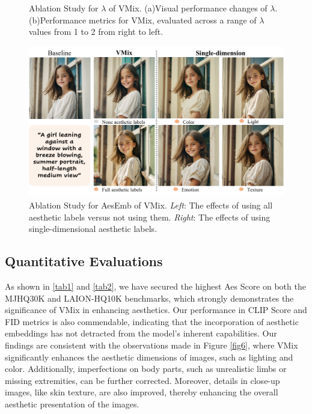 \begin{figure}[ht]
{\begin{minipage}[t]{0.54\linewidth}
    \end{minipage}}
    \caption{Ablation Study for $\lambda$ of VMix. (a)Visual performance changes of $\lambda$. (b)Performance metrics for VMix, evaluated across a range of $\lambda$ values from 1 to 2 from right to left. }
    \label{fig8}
\end{figure}


\begin{figure}
    \centering
    \includegraphics[width=0.88\linewidth]{aes_emb_ab.pdf}
    \caption{Ablation Study for AesEmb of VMix. \textit{Left}: The effects of using all aesthetic labels versus not using them. \textit{Right}: The effects of using single-dimensional aesthetic labels.}
    \label{fig9}
\end{figure}

\subsection{Quantitative Evaluations}
As shown in \cref{tab1} and \cref{tab2}, we have secured the highest Aes Score on both the MJHQ30K and LAION-HQ10K benchmarks, which strongly demonstrates the significance of VMix in enhancing aesthetics. Our performance in CLIP Score and FID metrics is also commendable, indicating that the incorporation of aesthetic embeddings has not detracted from the model's inherent capabilities. Our findings are consistent with the observations made in Figure \ref{fig6}, where VMix significantly enhances the aesthetic dimensions of images, such as lighting and color. Additionally, imperfections on body parts, such as unrealistic limbs or missing extremities, can be further corrected. Moreover, details in close-up images, like skin texture, are also improved, thereby enhancing the overall aesthetic presentation of the images.

